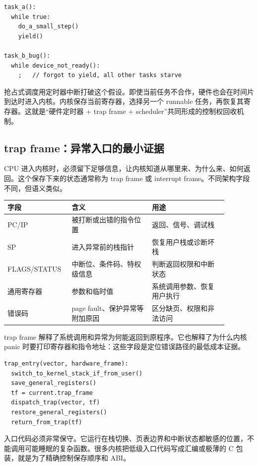\begin{lstlisting}
task_a():
  while true:
    do_a_small_step()
    yield()

task_b_bug():
  while device_not_ready():
    ;   // forgot to yield, all other tasks starve
\end{lstlisting}

抢占式调度用定时器中断打破这个假设。即使当前任务不合作，硬件也会在时间片到达时进入内核。内核保存当前寄存器，选择另一个 runnable 任务，再恢复其寄存器。这就是“硬件定时器 + trap frame + scheduler”共同形成的控制权回收机制。

\subsection{trap frame：异常入口的最小证据}

CPU 进入内核时，必须留下足够信息，让内核知道从哪里来、为什么来、如何返回。这个保存下来的状态通常称为 trap frame 或 interrupt frame。不同架构字段不同，但语义类似。

\begin{longtable}{p{0.22\linewidth}p{0.34\linewidth}p{0.32\linewidth}}
\toprule
字段 & 含义 & 用途 \\
\midrule
PC/IP & 被打断或出错的指令位置 & 返回、信号、调试栈 \\
SP & 进入异常前的栈指针 & 恢复用户栈或诊断坏栈 \\
FLAGS/STATUS & 中断位、条件码、特权级信息 & 判断返回权限和中断状态 \\
通用寄存器 & 参数和临时值 & 系统调用参数、恢复用户执行 \\
错误码 & page fault、保护异常等附加原因 & 区分缺页、权限和非法访问 \\
\bottomrule
\end{longtable}

trap frame 解释了系统调用和异常为何能返回到原程序。它也解释了为什么内核 panic 时要打印寄存器和指令地址：这些字段是定位错误路径的最低成本证据。

\begin{lstlisting}
trap_entry(vector, hardware_frame):
  switch_to_kernel_stack_if_from_user()
  save_general_registers()
  tf = current.trap_frame
  dispatch_trap(vector, tf)
  restore_general_registers()
  return_from_trap(tf)
\end{lstlisting}

入口代码必须非常保守。它运行在栈切换、页表边界和中断状态都敏感的位置，不能调用可能睡眠的复杂函数。很多内核把低级入口代码写成汇编或极薄的 C 包装，就是为了精确控制保存顺序和 ABI。

